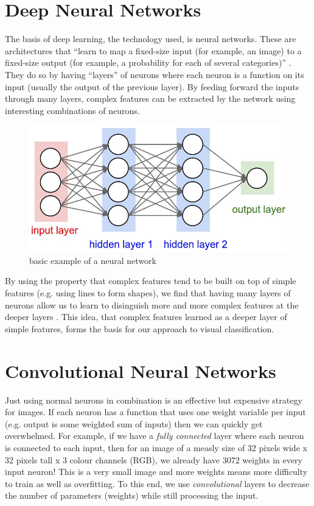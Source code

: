 \documentclass[letterpaper,12pt,titlepage,oneside,final]{book}
\begin{document}
\section{Deep Neural Networks}
The basis of deep learning, the technology used, is neural networks. These are architectures that ``learn to map a fixed-size input (for example, an image) to a fixed-size output (for example, a probability for each of several categories)'' \cite{deep-learning-article}. They do so by having ``layers'' of neurons where each neuron is a function on its input (usually the output of the previous layer). By feeding forward the inputs through many layers, complex features can be extracted by the network using interesting combinations of neurons. 

\begin{figure}
	\centering
	\includegraphics[scale=0.3]{neural_net}
	\caption{basic example of a neural network \cite{cs231n}}
\end{figure}

By using the property that complex features tend to be built on top of simple features (e.g. using lines to form shapes), we find that having many layers of neurons allow us to learn to disinguish more and more complex features at the deeper layers \cite{deep-learning-article}. This idea, that complex features learned as a deeper layer of simple features, forms the basis for our approach to visual classification. 

\section{Convolutional Neural Networks}
Just using normal neurons in combination is an effective but expensive strategy for images. If each neuron has a function that uses one weight variable per input (e.g. output is some weighted sum of inputs) then we can quickly get overwhelmed. For example, if we have a \textit{fully connected} layer where each neuron is connected to each input, then for an image of a measly size of 32 pixels wide x 32 pixels tall x 3 colour channels (RGB), we already have 3072 weights in every input neuron! This is a very small image and more weights means more difficulty to train as well as overfitting. To this end, we use \textit{convolutional} layers to decrease the number of parameters (weights) while still processing the input. 
\end{document}
